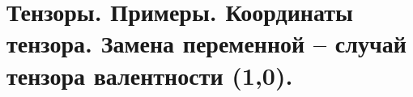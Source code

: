 \section{
 Тензоры. Примеры. Координаты тензора. Замена переменной – случай тензора валентности (1,0).
}
